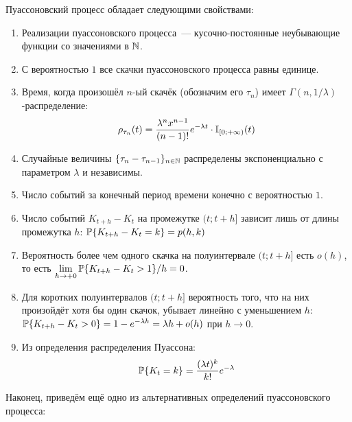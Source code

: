 \begin{statement}
    \label{statement:special:Poisson_process_properties}
    Пуассоновский процесс обладает следующими свойствами:
    \begin{enumerate}
        \item
            Реализации пуассоновского процесса~--- кусочно-постоянные неубывающие функции со значениями в $ \mathbb{N} $.
        \item
            С вероятностью $ 1 $ все скачки пуассоновского процесса равны единице.
        \item
            Время, когда произошёл $ n $-ый скачёк (обозначим его $ \tau_n $) имеет $ \Gamma(n, 1/\lambda) $-распределение:
            \[
                \rho_{\tau_n}(t) = \frac{\lambda^n x^{n-1}}{(n-1)!} e^{-\lambda t} \cdot \mathbb{I}_{[0;+\infty)}(t)
            \]
        \item
            Случайные величины $ \{\tau_{n} - \tau_{n-1}\}_{n \in \mathbb{N}} $ распределены экспоненциально с параметром $ \lambda $ и независимы.
        \item
            Число событий за конечный период времени конечно с вероятностью $ 1 $.
        \item
            Число событий $ K_{t+h} - K_t $ на промежутке $ (t; t+h] $ зависит лишь от длины промежутка $ h $:
            $ \mathbb{P} \{ K_{t + h} - K_t = k \} = p(h, k) $
        \item
            Вероятность более чем одного скачка на полуинтервале $ (t; t + h] $ есть $ o(h) $,
            то есть $ \displaystyle \lim_{h \to +0} \mathbb{P} \{ K_{t+h} - K_t > 1 \} / h = 0 $.
        \item
            Для коротких полуинтервалов $ (t; t+h] $ вероятность того, что на них произойдёт хотя бы один скачок,
            убывает линейно с уменьшением $ h $: $ \mathbb{P} \{ K_{t+h} - K_t > 0 \} = 1 - e^{-\lambda h} = \lambda h + o(h) $ при $ h \to 0 $.
        \item
            Из определения распределения Пуассона:
            \[
                \mathbb{P}\{K_t = k\} = \frac{(\lambda t)^k}{k!} e^{-\lambda}
            \]
    \end{enumerate}
\end{statement}

Наконец, приведём ещё одно из альтернативных определений пуассоновского процесса:

